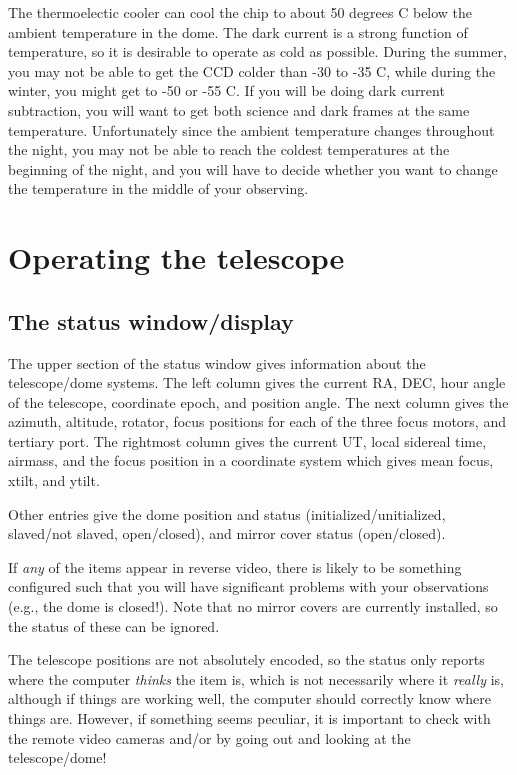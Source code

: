 \documentclass[10pt]{report}
\begin{document}
The thermoelectic cooler can cool the chip to about 50 degrees C below the
ambient temperature in the dome. The dark current is a strong function of
temperature, so it is desirable to operate as cold as possible. During the
summer, you may not be able to get the CCD colder than -30 to -35 C, while
during the winter, you might get to -50 or -55 C. If you will be doing
dark current subtraction, you will want to get both science and dark frames
at the same temperature. Unfortunately since the ambient temperature 
changes throughout the night, you may not be able to reach the coldest
temperatures at the beginning of the night, and you will have to decide
whether you want to change the temperature in the middle of your observing.

\chapter{Operating the telescope}

\section{The status window/display}

The upper section of the status window gives information about the 
telescope/dome systems. The left column gives the current RA, DEC, 
hour angle of the telescope, coordinate epoch, and position angle.
The next column gives the azimuth, altitude, rotator, focus positions
for each of the three focus motors, and tertiary port. 
The rightmost column gives the
current UT, local sidereal time, airmass, and the focus position in
a coordinate system which gives mean focus, xtilt, and ytilt.

Other entries give the dome position and status (initialized/unitialized,
slaved/not slaved, open/closed), and mirror cover status (open/closed).

If {\it any} of the items appear in reverse video, there is likely to be
something configured such that you will have significant problems with
your observations (e.g., the dome is closed!). Note that no mirror 
covers are currently installed, so the status of these can be ignored.

The telescope positions are not absolutely encoded, so the status only reports
where the computer {\it thinks} the  item is, which is not necessarily
where it {\it really} is, although if things are working well, the
computer should correctly know where things are.  However, if
something seems peculiar, it is important to check with the remote
video cameras and/or by going out and looking at the telescope/dome!
\end{document}
